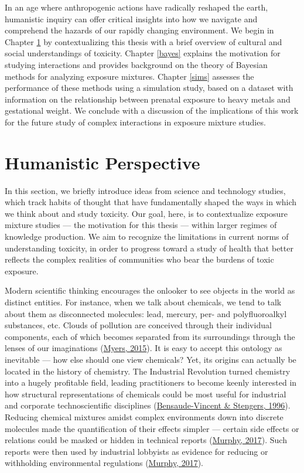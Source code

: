 \documentclass[12pt, twoside]{amherstthesis}
\begin{document}
In an age where anthropogenic actions have radically reshaped the earth, humanistic inquiry can offer critical insights into how we navigate and comprehend the hazards of our rapidly changing environment. We begin in Chapter \ref{humanistic} by contextualizing this thesis with a brief overview of cultural and social understandings of toxicity. Chapter \ref{bayes} explains the motivation for studying interactions and provides background on the theory of Bayesian methods for analyzing exposure mixtures. Chapter \ref{sims} assesses the performance of these methods using a simulation study, based on a dataset with information on the relationship between prenatal exposure to heavy metals and gestational weight. We conclude with a discussion of the implications of this work for the future study of complex interactions in exposure mixture studies.

\hypertarget{humanistic}{%
\chapter{Humanistic Perspective}\label{humanistic}}

In this section, we briefly introduce ideas from science and technology studies, which track habits of thought that have fundamentally shaped the ways in which we think about and study toxicity. Our goal, here, is to contextualize exposure mixture studies --- the motivation for this thesis --- within larger regimes of knowledge production. We aim to recognize the limitations in current norms of understanding toxicity, in order to progress toward a study of health that better reflects the complex realities of communities who bear the burdens of toxic exposure.

Modern scientific thinking encourages the onlooker to see objects in the world as distinct entities. For instance, when we talk about chemicals, we tend to talk about them as disconnected molecules: lead, mercury, per- and polyfluoroalkyl substances, etc. Clouds of pollution are conceived through their individual components, each of which becomes separated from its surroundings through the lenses of our imaginations (\protect\hyperlink{ref-myers_rendering_2015}{Myers, 2015}). It is easy to accept this ontology as inevitable --- how else should one view chemicals? Yet, its origins can actually be located in the history of chemistry. The Industrial Revolution turned chemistry into a hugely profitable field, leading practitioners to become keenly interested in how structural representations of chemicals could be most useful for industrial and corporate technoscientific disciplines (\protect\hyperlink{ref-bensaude-vincent_history_1996}{Bensaude-Vincent \& Stengers, 1996}). Reducing chemical mixtures amidst complex environments down into discrete molecules made the quantification of their effects simpler --- certain side effects or relations could be masked or hidden in technical reports (\protect\hyperlink{ref-murphy_alterlife_2017}{Murphy, 2017}). Such reports were then used by industrial lobbyists as evidence for reducing or withholding environmental regulations (\protect\hyperlink{ref-murphy_alterlife_2017}{Murphy, 2017}).
\end{document}

